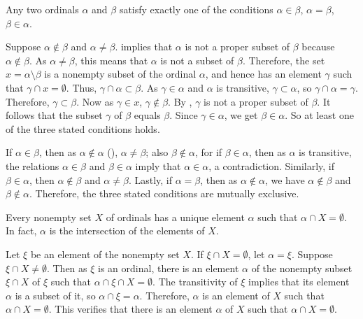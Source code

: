 \documentclass{article}
\begin{document}
\begin{theorem}
  \label{thm:xut6v700}
  Any two ordinals \(\alpha\) and \(\beta\) satisfy exactly one of the
  conditions \(\alpha \in \beta\), \(\alpha = \beta\),
  \(\beta \in \alpha\).
\end{theorem}

Suppose \(\alpha \notin \beta\) and \(\alpha \neq \beta\).
 implies that \(\alpha\) is not a proper subset of
\(\beta\) because \(\alpha \notin \beta\).  As \(\alpha \neq \beta\),
this means that \(\alpha\) is not a subset of \(\beta\).  Therefore,
the set \(x = \alpha \setminus \beta\) is a nonempty subset of the
ordinal \(\alpha\), and hence has an element \(\gamma\) such that
\(\gamma \cap x = \emptyset\).  Thus,
\(\gamma \cap \alpha \subset \beta\).  As \(\gamma \in \alpha\) and
\(\alpha\) is transitive, \(\gamma \subset \alpha\), so
\(\gamma \cap \alpha = \gamma\).  Therefore, \(\gamma \subset \beta\).
Now as \(\gamma \in x\), \(\gamma \notin \beta\).  By
, \(\gamma\) is not a proper subset of \(\beta\).
It follows that the subset \(\gamma\) of \(\beta\) equals \(\beta\).
Since \(\gamma \in \alpha\), we get \(\beta \in \alpha\).  So at least
one of the three stated conditions holds.

If \(\alpha \in \beta\), then as \(\alpha \notin \alpha\)
(), \(\alpha \neq \beta\); also
\(\beta \notin \alpha\), for if \(\beta \in \alpha\), then as
\(\alpha\) is transitive, the relations \(\alpha \in \beta\) and
\(\beta \in \alpha\) imply that \(\alpha \in \alpha\), a
contradiction.  Similarly, if \(\beta \in \alpha\), then
\(\alpha \notin \beta\) and \(\alpha \neq \beta\).  Lastly, if
\(\alpha = \beta\), then as \(\alpha \notin \alpha\), we have
\(\alpha \notin \beta\) and \(\beta \notin \alpha\).  Therefore, the
three stated conditions are mutually exclusive.

\begin{theorem}
  \label{thm:4ca41efr}
  Every nonempty set \(X\) of ordinals has a unique element \(\alpha\)
  such that \(\alpha \cap X = \emptyset\).  In fact, \(\alpha\) is the
  intersection of the elements of \(X\).
\end{theorem}

Let \(\xi\) be an element of the nonempty set \(X\).  If
\(\xi \cap X = \emptyset\), let \(\alpha = \xi\).  Suppose
\(\xi \cap X \neq \emptyset\).  Then as \(\xi\) is an ordinal, there
is an element \(\alpha\) of the nonempty subset \(\xi \cap X\) of
\(\xi\) such that \(\alpha \cap \xi \cap X = \emptyset\).  The
transitivity of \(\xi\) implies that its element \(\alpha\) is a
subset of it, so \(\alpha \cap \xi = \alpha\).  Therefore, \(\alpha\)
is an element of \(X\) such that \(\alpha \cap X = \emptyset\).  This
verifies that there is an element \(\alpha\) of \(X\) such that
\(\alpha \cap X = \emptyset\).
\end{document}
